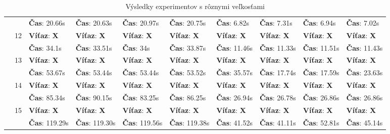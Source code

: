 \begin{table}[H]
\begin{tiny}
\begin{tabular}{|l|l|l|l|l||l|||l|l|l||l|}
            & & \textbf{Čas}: 20.66s & \textbf{Čas}: 20.63s & \textbf{Čas}: 20.97s &  \textbf{Čas}: 20.75s & \textbf{Čas}: 6.82s & \textbf{Čas}: 7.31s & \textbf{Čas}: 6.94s & \textbf{Čas}: 7.02s \\
            \cline{2-10}
            & \multirow{2}{*}{12}
            & \textbf{Víťaz}: \textbf{X} & \textbf{Víťaz}: \textbf{X} & \textbf{Víťaz}: \textbf{X} & \textbf{Víťaz}: \textbf{X} & \textbf{Víťaz}: \textbf{X} & \textbf{Víťaz}: \textbf{X} & \textbf{Víťaz}: \textbf{X} & \textbf{Víťaz}: \textbf{X} \\
            & & \textbf{Čas}: 34.1s & \textbf{Čas}: 33.51s & \textbf{Čas}: 34s &  \textbf{Čas}: 33.87s & \textbf{Čas}: 11.46s & \textbf{Čas}: 11.33s & \textbf{Čas}: 11.51s & \textbf{Čas}: 11.43s \\
            \cline{2-10}
            & \multirow{2}{*}{13}
            & \textbf{Víťaz}: \textbf{X} & \textbf{Víťaz}: \textbf{X} & \textbf{Víťaz}: \textbf{X} & \textbf{Víťaz}: \textbf{X} & \textbf{Víťaz}: \textbf{X} & \textbf{Víťaz}: \textbf{X} & \textbf{Víťaz}: \textbf{X} & \textbf{Víťaz}: \textbf{X} \\
            & & \textbf{Čas}: 53.67s & \textbf{Čas}: 53.44s & \textbf{Čas}: 53.44s &  \textbf{Čas}: 53.52s & \textbf{Čas}: 35.57s & \textbf{Čas}: 17.74s & \textbf{Čas}: 17.59s & \textbf{Čas}: 23.63s \\
            \cline{2-10}
            & \multirow{2}{*}{14}
            & \textbf{Víťaz}: \textbf{X} & \textbf{Víťaz}: \textbf{X} & \textbf{Víťaz}: \textbf{X} & \textbf{Víťaz}: \textbf{X} & \textbf{Víťaz}: \textbf{X} & \textbf{Víťaz}: \textbf{X} & \textbf{Víťaz}: \textbf{X} & \textbf{Víťaz}: \textbf{X} \\
            & & \textbf{Čas}: 85.34s & \textbf{Čas}: 90.15s & \textbf{Čas}: 83.25s &  \textbf{Čas}: 86.25s & \textbf{Čas}: 26.94s & \textbf{Čas}: 26.78s & \textbf{Čas}: 26.86s & \textbf{Čas}: 26.86s \\
            \cline{2-10}
            & \multirow{2}{*}{15}
            & \textbf{Víťaz}: \textbf{X} & \textbf{Víťaz}: \textbf{X} & \textbf{Víťaz}: \textbf{X} & \textbf{Víťaz}: \textbf{X} & \textbf{Víťaz}: \textbf{X} & \textbf{Víťaz}: \textbf{X} & \textbf{Víťaz}: \textbf{X} & \textbf{Víťaz}: \textbf{X} \\
            & & \textbf{Čas}: 119.29s & \textbf{Čas}: 119.30s & \textbf{Čas}: 119.56s &  \textbf{Čas}: 119.38s & \textbf{Čas}: 41.52s & \textbf{Čas}: 41.11s & \textbf{Čas}: 52.81s & \textbf{Čas}: 45.14s \\
            \hline
        \end{tabular}
    \end{tiny}
    \caption{Výsledky experimentov s rôznymi veľkosťami}\label{table:experiments-boards}
\end{table}
\clearpage

